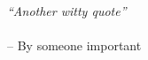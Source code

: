 
\cleardoublepage
\thispagestyle{empty}
\
\vfill

\hfill\parbox{6cm}{ 
\emph{``Another witty quote''}\\
\null\\
\hspace*{0.5cm} -- By someone important
}

\cleardoublepage
\pagestyle{fancy}
